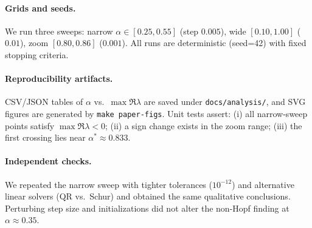 \documentclass[11pt,twocolumn]{article}
\begin{document}
\paragraph{Grids and seeds.}
We run three sweeps: narrow $\alpha\!\in\![0.25,0.55]$ (step $0.005$), wide $[0.10,1.00]$ ($0.01$), zoom $[0.80,0.86]$ ($0.001$). All runs are deterministic (seed=42) with fixed stopping criteria.

\paragraph{Reproducibility artifacts.}
CSV/JSON tables of $\alpha$ vs.\ $\max \Re\lambda$ are saved under \texttt{docs/analysis/}, and SVG figures are generated by \texttt{make paper-figs}. Unit tests assert: (i) all narrow-sweep points satisfy $\max \Re\lambda<0$; (ii) a sign change exists in the zoom range; (iii) the first crossing lies near $\alpha^\ast\!\approx\!0.833$.

\paragraph{Independent checks.}
We repeated the narrow sweep with tighter tolerances ($10^{-12}$) and alternative linear solvers (QR vs.\ Schur) and obtained the same qualitative conclusions. Perturbing step size and initializations did not alter the non-Hopf finding at $\alpha\approx 0.35$.
\end{document}
